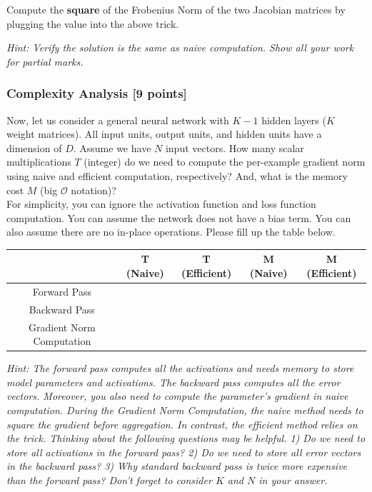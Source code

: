 \documentclass[11pt]{article}
\begin{document}
\noindent Compute the \textbf{square} of the Frobenius Norm of the two Jacobian matrices by plugging the value into the above trick. 

\noindent \emph{Hint: Verify the solution is the same as naive computation. Show all your work for partial marks.}


\subsubsection{Complexity Analysis {\color{blue}[9 points]}}
Now, let us consider a general neural network with $K-1$ hidden layers ($K$ weight matrices). All input units, output units, and hidden units have a dimension of $D$. Assume we have $N$ input vectors. How many scalar multiplications $T$ (integer) do we need to compute the per-example gradient norm using naive and efficient computation, respectively? And, what is the memory cost $M$ (big $\mathcal{O}$ notation)? \\

\noindent For simplicity, you can ignore the activation function and loss function computation. You can assume the network does not have a bias term. You can also assume there are no in-place operations. Please fill up the table below.


\begin{table}[h]
\centering
\begin{tabular}{|c|c|c|c|c|}
\hline
                          & T (Naive) & T (Efficient) & M (Naive) & M (Efficient) \\ \hline
Forward Pass              &           &               &           &               \\ \hline
Backward Pass             &           &               &           &               \\ \hline
Gradient Norm Computation &           &               &           &               \\ \hline
\end{tabular}
\end{table}

\noindent \emph{Hint: The forward pass computes all the activations and needs memory to store model parameters and activations. The backward pass computes all the error vectors. Moreover, you also need to compute the parameter's gradient in naive computation. During the Gradient Norm Computation, the naive method needs to square the gradient before aggregation. In contrast, the efficient method relies on the trick. Thinking about the following questions may be helpful. 1) Do we need to store all activations in the forward pass? 2) Do we need to store all error vectors in the backward pass? 3) Why standard backward pass is twice more expensive than the forward pass? Don't forget to consider $K$ and $N$ in your answer.}
\end{document}
